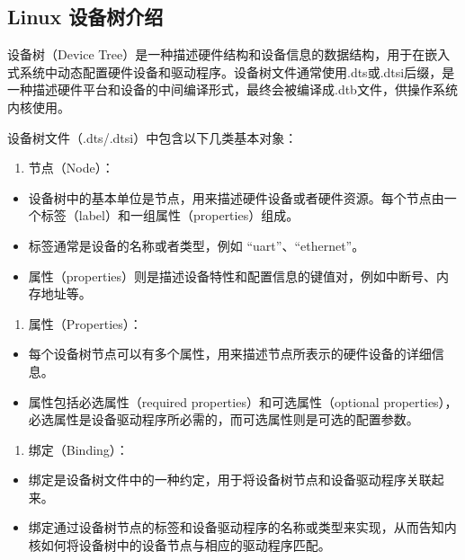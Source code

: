 \subsection{Linux 设备树介绍}\label{sec:07-soc-and-system-005}

设备树（Device Tree）是一种描述硬件结构和设备信息的数据结构，用于在嵌入式系统中动态配置硬件设备和驱动程序。设备树文件通常使用.dts或.dtsi后缀，是一种描述硬件平台和设备的中间编译形式，最终会被编译成.dtb文件，供操作系统内核使用。

设备树文件（.dts/.dtsi）中包含以下几类基本对象：

\begin{enumerate}
\def\labelenumi{\arabic{enumi}.}
\tightlist
\item
  节点（Node）：
\end{enumerate}

\begin{itemize}
\item
  设备树中的基本单位是节点，用来描述硬件设备或者硬件资源。每个节点由一个标签（label）和一组属性（properties）组成。
\item
  标签通常是设备的名称或者类型，例如 ``uart''、``ethernet''。
\item
  属性（properties）则是描述设备特性和配置信息的键值对，例如中断号、内存地址等。
\end{itemize}

\begin{enumerate}
\def\labelenumi{\arabic{enumi}.}
\setcounter{enumi}{1}
\tightlist
\item
  属性（Properties）：
\end{enumerate}

\begin{itemize}
\item
  每个设备树节点可以有多个属性，用来描述节点所表示的硬件设备的详细信息。
\item
  属性包括必选属性（required properties）和可选属性（optional properties），必选属性是设备驱动程序所必需的，而可选属性则是可选的配置参数。
\end{itemize}

\begin{enumerate}
\def\labelenumi{\arabic{enumi}.}
\setcounter{enumi}{2}
\tightlist
\item
  绑定（Binding）：
\end{enumerate}

\begin{itemize}
\item
  绑定是设备树文件中的一种约定，用于将设备树节点和设备驱动程序关联起来。
\item
  绑定通过设备树节点的标签和设备驱动程序的名称或类型来实现，从而告知内核如何将设备树中的设备节点与相应的驱动程序匹配。
\end{itemize}

